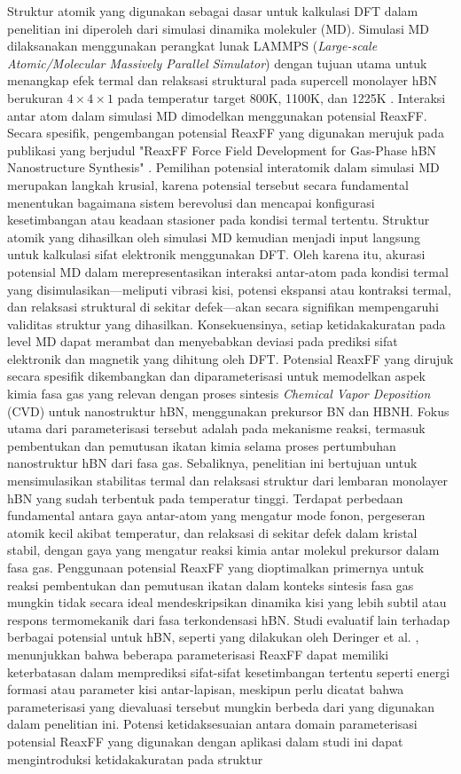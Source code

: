 Struktur atomik yang digunakan sebagai dasar untuk kalkulasi DFT dalam penelitian ini diperoleh dari simulasi dinamika molekuler (MD). Simulasi MD dilaksanakan menggunakan perangkat lunak LAMMPS (\textit{Large-scale Atomic/Molecular Massively Parallel Simulator}) \citep{Plimpton1995} dengan tujuan utama untuk menangkap efek termal dan relaksasi struktural pada supercell monolayer hBN berukuran $4 \times 4 \times 1$ pada temperatur target 800K, 1100K, dan 1225K . Interaksi antar atom dalam simulasi MD dimodelkan menggunakan potensial ReaxFF. Secara spesifik, pengembangan potensial ReaxFF yang digunakan merujuk pada publikasi yang berjudul "ReaxFF Force Field Development for Gas-Phase hBN Nanostructure Synthesis" \citep{Lele2022}. Pemilihan potensial interatomik dalam simulasi MD merupakan langkah krusial, karena potensial tersebut secara fundamental menentukan bagaimana sistem berevolusi dan mencapai konfigurasi kesetimbangan atau keadaan stasioner pada kondisi termal tertentu. Struktur atomik yang dihasilkan oleh simulasi MD kemudian menjadi input langsung untuk kalkulasi sifat elektronik menggunakan DFT. Oleh karena itu, akurasi potensial MD dalam merepresentasikan interaksi antar-atom pada kondisi termal yang disimulasikan—meliputi vibrasi kisi, potensi ekspansi atau kontraksi termal, dan relaksasi struktural di sekitar defek—akan secara signifikan mempengaruhi validitas struktur yang dihasilkan. Konsekuensinya, setiap ketidakakuratan pada level MD dapat merambat dan menyebabkan deviasi pada prediksi sifat elektronik dan magnetik yang dihitung oleh DFT. Potensial ReaxFF yang dirujuk \citep{Lele2022} secara spesifik dikembangkan dan diparameterisasi untuk memodelkan aspek kimia fasa gas yang relevan dengan proses sintesis \textit{Chemical Vapor Deposition} (CVD) untuk nanostruktur hBN, menggunakan prekursor BN dan HBNH. Fokus utama dari parameterisasi tersebut adalah pada mekanisme reaksi, termasuk pembentukan dan pemutusan ikatan kimia selama proses pertumbuhan nanostruktur hBN dari fasa gas. Sebaliknya, penelitian ini bertujuan untuk mensimulasikan stabilitas termal dan relaksasi struktur dari lembaran monolayer hBN yang sudah terbentuk pada temperatur tinggi. Terdapat perbedaan fundamental antara gaya antar-atom yang mengatur mode fonon, pergeseran atomik kecil akibat temperatur, dan relaksasi di sekitar defek dalam kristal stabil, dengan gaya yang mengatur reaksi kimia antar molekul prekursor dalam fasa gas. Penggunaan potensial ReaxFF yang dioptimalkan primernya untuk reaksi pembentukan dan pemutusan ikatan dalam konteks sintesis fasa gas mungkin tidak secara ideal mendeskripsikan dinamika kisi yang lebih subtil atau respons termomekanik dari fasa terkondensasi hBN. Studi evaluatif lain terhadap berbagai potensial untuk hBN, seperti yang dilakukan oleh Deringer et al. \citep{Deringer2020}, menunjukkan bahwa beberapa parameterisasi ReaxFF dapat memiliki keterbatasan dalam memprediksi sifat-sifat kesetimbangan tertentu seperti energi formasi atau parameter kisi antar-lapisan, meskipun perlu dicatat bahwa parameterisasi yang dievaluasi tersebut mungkin berbeda dari yang digunakan dalam penelitian ini. Potensi ketidaksesuaian antara domain parameterisasi potensial ReaxFF yang digunakan dengan aplikasi dalam studi ini dapat mengintroduksi ketidakakuratan pada struktur 